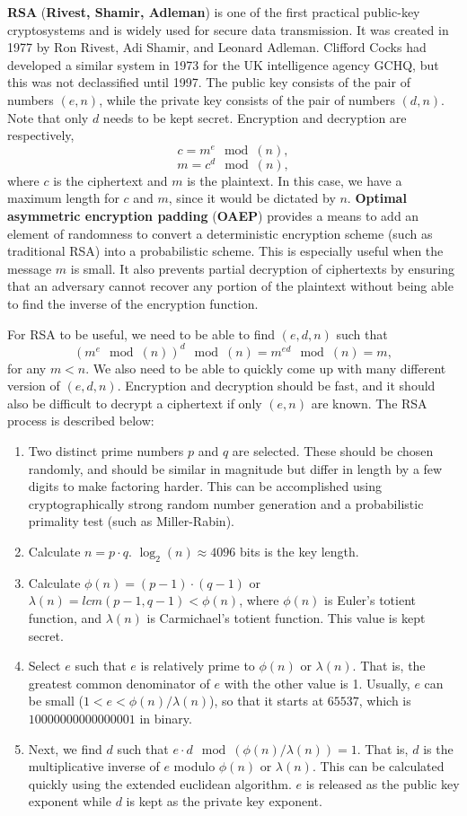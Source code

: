\documentclass[11pt]{article}
\theoremstyle{plain} %
\theoremstyle{definition}
\theoremstyle{example}
\theoremstyle{remark}
\begin{document}
\textbf{RSA} (\textbf{Rivest, Shamir, Adleman}) is one of the first practical public-key cryptosystems and is widely used for secure data transmission. It was created in 1977 by Ron Rivest, Adi Shamir, and Leonard Adleman. Clifford Cocks had developed a similar system in 1973 for the UK intelligence agency GCHQ, but this was not declassified until 1997. The public key consists of the pair of numbers $(e,n)$, while the private key consists of the pair of numbers $(d,n)$. Note that only $d$ needs to be kept secret. 
Encryption and decryption are respectively,
$$c=m^e\mod(n),$$
$$m = c^d\mod(n),$$
where $c$ is the ciphertext and $m$ is the plaintext. In this case, we have a maximum length for $c$ and $m$, since it would be dictated by $n$. \textbf{Optimal asymmetric encryption padding} (\textbf{OAEP}) provides a means to add an element of randomness to convert a deterministic encryption scheme (such as traditional RSA) into a probabilistic scheme. This is especially useful when the message $m$ is small. It also prevents partial decryption of ciphertexts by ensuring that an adversary cannot recover any portion of the plaintext without being able to find the inverse of the encryption function. 

For RSA to be useful, we need to be able to find $(e,d,n)$ such that 
$$\left(m^e\mod(n)\right)^d\mod(n) = m^{ed}\mod(n) = m,$$
for any $m < n$. We also need to be able to quickly come up with many different version of $(e,d,n)$. Encryption and decryption should be fast, and it should also be difficult to decrypt a ciphertext if only $(e,n)$ are known. The RSA process is described below:
\begin{enumerate}
	\item Two distinct prime numbers $p$ and $q$ are selected. These should be chosen randomly, and should be similar in magnitude but differ in length by a few digits to make factoring harder. This can be accomplished using cryptographically strong random number generation and a probabilistic primality test (such as Miller-Rabin). 
	\item Calculate $n = p\cdot q$. $\log_2(n) \approx 4096$ bits is the key length. 
	\item Calculate $\phi(n) = (p-1)\cdot(q-1)$ or $\lambda(n) = lcm(p-1, q-1)<\phi(n)$, where $\phi(n)$ is Euler's totient function, and $\lambda(n)$ is Carmichael's totient function. This value is kept secret. 
	\item Select $e$ such that $e$ is relatively prime to $\phi(n)$ or $\lambda(n)$. That is, the greatest common denominator of $e$ with the other value is 1. Usually, $e$ can be small ($1 < e < \phi(n)/\lambda(n)$), so that it starts at $65537$, which is $10000000000000001$ in binary.
	\item Next, we find $d$ such that $e \cdot d \mod(\phi(n)/\lambda(n)) =1$. That is, $d$ is the multiplicative inverse of $e$ modulo $\phi(n)$ or $\lambda(n)$. This can be calculated quickly using the extended euclidean algorithm. $e$ is released as the public key exponent while $d$ is kept as the private key exponent. 
\end{enumerate}
\end{document}
